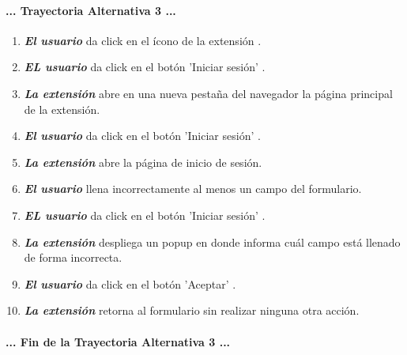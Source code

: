 \documentclass[12pt, a4paper, titlepage]{report}
\newcommand*{\img}[1]{%
    \raisebox{-.3\baselineskip}{%
        \texttt{[image: \#1]}%
    }%
}
\begin{document}
			    \paragraph{... Trayectoria Alternativa 3 ...}
				\begin{enumerate}
				
					\item \textbf{\textit{El usuario}} da click en el ícono de la extensión \img{imagenes/Disenio/Componente_1/UI_icon_escom.png}.
					
					\item \textbf{\textit{EL usuario}} da click en el botón 'Iniciar sesión' \img{imagenes/Disenio/Componente_1/UI_btn_login.png}.
					
					\item \textbf{\textit{La extensión}} abre en una nueva pestaña del navegador la página principal de la extensión.
					
					\item \textbf{\textit{El usuario}} da click en el botón 'Iniciar sesión' \img{imagenes/Disenio/Componente_1/UI_btn_login.png}.
					
					\item \textbf{\textit{La extensión}} abre la página de inicio de sesión.
					
					\item \textbf{\textit{El usuario}} llena incorrectamente al menos un campo del formulario.
					
					\item \textbf{\textit{EL usuario}} da click en el botón 'Iniciar sesión' \img{imagenes/Disenio/Componente_1/UI_btn_login.png}.
					
				    \item \textbf{\textit{La extensión}} despliega un popup en donde informa cuál campo está llenado de forma incorrecta.
					
					\item \textbf{\textit{El usuario}} da click en el botón 'Aceptar' \img{imagenes/Disenio/Componente_1/UI_btn_accept.png}.
					
					\item \textbf{\textit{La extensión}} retorna al formulario sin realizar ninguna otra acción.
					
				\end{enumerate}
				\paragraph{... Fin de la Trayectoria Alternativa 3 ...}
				\newpage
			    
\end{document}
